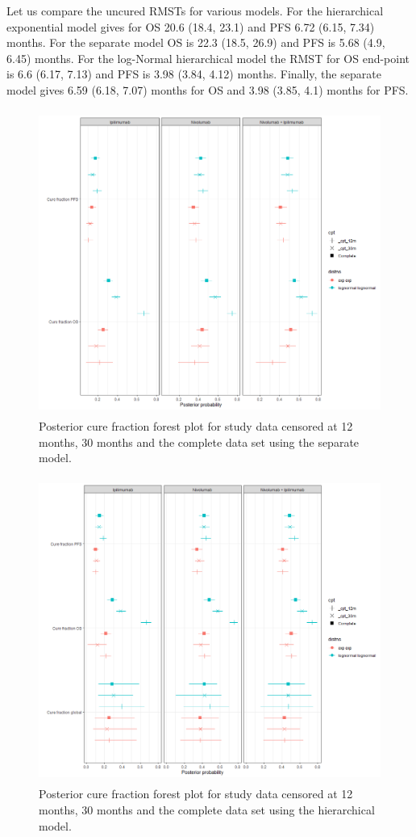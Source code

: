 \documentclass[AMA,STIX1COL]{WileyNJD-v2}
\begin{document}
Let us compare the uncured RMSTs for various models.
For the hierarchical exponential model gives for OS 20.6 (18.4, 23.1) and PFS 6.72 (6.15, 7.34) months.
For the separate model OS is 22.3 (18.5, 26.9) and PFS is 5.68 (4.9, 6.45) months.
For the log-Normal hierarchical model the RMST for OS end-point is 6.6 (6.17, 7.13) and PFS is 3.98 (3.84, 4.12) months.
Finally, the separate model gives 6.59 (6.18, 7.07) months for OS and 3.98 (3.85, 4.1) months for PFS.


\begin{figure}[!H]
\centering
\includegraphics[height=10cm, width=0.6\linewidth]{forest_plot_cf_sep_cpt.png}
\caption{\label{fig:forest_plot_cf_cutpoint_sep} Posterior cure fraction forest plot for study data censored at 12 months, 30 months and the complete data set using the separate model.}
\end{figure}

\begin{figure}[!H]
\centering
\includegraphics[height=10cm, width=0.6\linewidth]{forest_plot_cf_hier_cpt.png}
\caption{\label{fig:forest_plot_cf_cutpoint_hier} Posterior cure fraction forest plot for study data censored at 12 months, 30 months and the complete data set using the hierarchical model.}
\end{figure}
\end{document}
